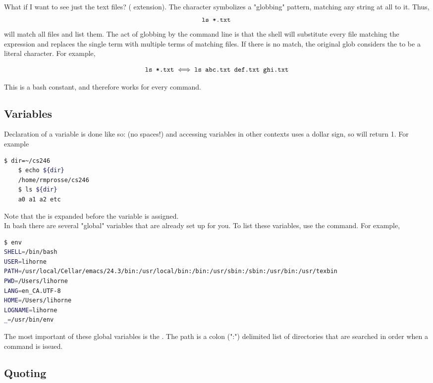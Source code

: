\documentclass[english, 11pt]{article}
\begin{document}
  What if I want to see just the text files? ( extension). The \tc{*} character symbolizes a "globbing" pattern, matching any string at all to it. Thus,
  \[ \mbox { \texttt{ls *.txt }} \]
  will match all  files and list them. The act of globbing by the command line is that the shell will substitute every file matching the expression and replaces the single term with multiple terms of matching files. If there is no match, the original glob considers the \tc{*} to be a literal character. For example,

  \[ \mbox{\texttt{ls *.txt}} \iff \mbox{\texttt{ls abc.txt def.txt ghi.txt}} \]

  This is a bash constant, and therefore works for every command.

  \subsection{Variables}

  Declaration of a variable is done like so:  (no spaces!) and accessing variables in other contexts uses a dollar sign, so  will return 1. For example
  \begin{lstlisting}[language=bash,numbers=none]
    $ dir=~/cs246
    $ echo ${dir}
    /home/rmprosse/cs246
    $ ls ${dir}
    a0 a1 a2 etc
  \end{lstlisting}

  Note that the \tc{$\sim$} is expanded before the variable is assigned. \\

  In bash there are several "global" variables that are already set up for you. To list these variables, use the  command. For example,
  \begin{lstlisting}[language=bash,numbers=none]
$ env
SHELL=/bin/bash
USER=lihorne
PATH=/usr/local/Cellar/emacs/24.3/bin:/usr/local/bin:/bin:/usr/sbin:/sbin:/usr/bin:/usr/texbin
PWD=/Users/lihorne
LANG=en_CA.UTF-8
HOME=/Users/lihorne
LOGNAME=lihorne
_=/usr/bin/env
  \end{lstlisting}

  The most important of these global variables is the . The path is a colon (":") delimited list of directories that are searched in order when a command is issued.

  \subsection{Quoting}
\end{document}
